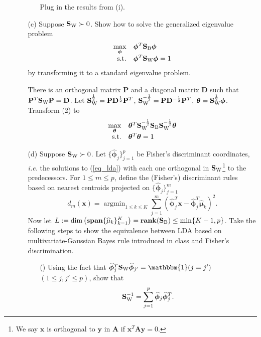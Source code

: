 \documentclass[10pt]{article}
\theoremstyle{definition}
\theoremstyle{remark}
\newcommand{\bx}{\bm{x}}
\newcommand{\by}{\bm{y}}
\newcommand{\Ab}{\mathbf{A}}
\newcommand{\Db}{\mathbf{D}}
\newcommand{\Pb}{\mathbf{P}}
\newcommand{\Sbb}{\mathbf{S}}
\newcommand{\bmu}{\bm{\mu}}
\newcommand{\btheta}{\bm{\theta}}
\newcommand{\bphi}{\bm{\phi}}
\newcommand{\argmin}{\mathop{\mathrm{argmin}}}
\newcommand{\bspan}{\mathbf{span}}	%
\newcommand{\brank}{\mathbf{rank}}	%
\newcommand{\bbone}{{\mathbbm{1}}}	%
\begin{document}
\begin{enumerate}
\begin{itemize}
\begin{itemize}[leftmargin=*]
			Plug in the results from (i).
		\end{itemize}
		
		\item [(c)] Suppose $ \Sbb_{\rm W} \succ 0 $. Show how to solve the generalized eigenvalue problem 
		\begin{align}
		\begin{array}{rl}
		\max\limits_{\bphi} & \bphi^{T}\Sbb_{\rm B} \bphi\\
		\textrm{s.t.} & \bphi^{T}\Sbb_{\rm W}\bphi = 1
		\end{array}\label{eq_lda}
		\end{align}
		by transforming it to a standard eigenvalue problem. 
		
		There is an orthogonal matrix $\Pb$ and a diagonal matrix $\Db$ such that $\Pb^T \Sbb_{\rm W} \Pb= \Db$. Let $\Sbb_{\rm W}^{\frac{1}{2}} = \Pb\Db^{\frac{1}{2}}\Pb^T$, $\Sbb_{\rm W}^{-\frac{1}{2}} = \Pb\Db^{-\frac{1}{2}}\Pb^T$, $ \btheta = \Sbb_{\rm W}^{\frac{1}{2}} \bphi $. Transform (2) to
		\begin{align*}
		\begin{array}{rl}
		\max\limits_{\btheta} & \btheta^{T} \Sbb_{\rm W}^{-\frac{1}{2}} \Sbb_{\rm B} \Sbb_{\rm W}^{-\frac{1}{2}} \btheta\\
		\textrm{s.t.} & \btheta^{T}\btheta = 1
		\end{array}\label{eq_lda}
		\end{align*}
		
		\item [(d)] Suppose $ \Sbb_{\rm W} \succ 0 $. Let $ \{\widehat{\bphi}_{j}\}_{j=1}^{p} $ be Fisher's discriminant coordinates, \textit{i.e.} the solutions to (\ref{eq_lda}) with each one orthogonal in $ \Sbb_{\rm W} $\footnote{We say $ \bx $ is orthogonal to $ \by $ in $ \Ab $ if $ \bx^{T}\Ab\by = 0 $.} to the predecessors. For $ 1 \le m \le p $, define the (Fisher's) discriminant rules based on nearest centroids projected on $ \{ \widehat{\bphi}_{j} \}_{j=1}^{m} $ 
		\[ d_{m}(\bx) = \argmin_{1 \le k \le K} \sum_{j=1}^{m}\left( \widehat{\bphi}_{j}^{T}\bx - \widehat{\bphi}_{j}^{T}\widehat{\bmu}_{k} \right)^{2}. \]
		Now let $ L := \dim\left( \bspan\{ \widehat{\mu}_{k} \}_{k=1}^{K}\right) = \brank(\Sbb_{\rm B}) \le \min\{K-1,p\}  $. Take the following steps to show the equivalence between LDA based on multivariate-Gaussian Bayes rule introduced in class and Fisher's discrimination.
		\begin{itemize}[leftmargin=*]
			\item [(\romannum{1})] Using the fact that $ \widehat{\bphi}_{j}^{T}\Sbb_{\rm W}\widehat{\bphi}_{j'} = \bbone(j=j') $ $ (1 \le j,j' \le p) $, show that
			\[ \Sbb_{\rm W}^{-1} =  \sum_{j=1}^{p}\widehat{\bphi}_{j}\widehat{\bphi}_{j}^{T}. \]
			

\end{itemize}
\end{itemize}
\end{enumerate}
\end{document}
